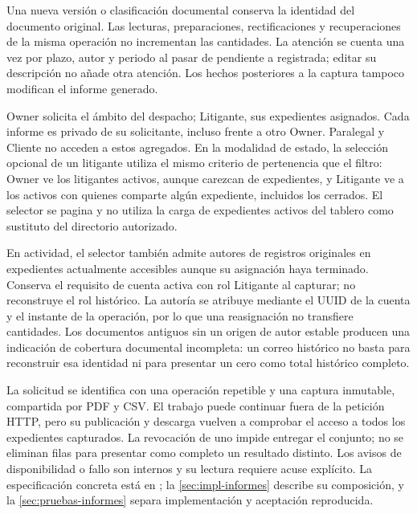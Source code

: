 Una nueva versión o clasificación documental conserva la identidad del documento
original. Las lecturas, preparaciones, rectificaciones y recuperaciones de la
misma operación no incrementan las cantidades. La atención se cuenta una vez por
plazo, autor y periodo al pasar de pendiente a registrada; editar su descripción
no añade otra atención. Los hechos posteriores a la captura tampoco modifican
el informe generado.

Owner solicita el ámbito del despacho; Litigante, sus expedientes asignados.
Cada informe es privado de su solicitante, incluso frente a otro Owner.
Paralegal y Cliente no acceden a estos agregados. En la modalidad de estado,
la selección opcional de un litigante utiliza el mismo criterio de pertenencia
que el filtro: Owner ve los litigantes activos, aunque carezcan de expedientes,
y Litigante ve a los
activos con quienes comparte algún expediente, incluidos los cerrados. El
selector se pagina y no utiliza la carga de expedientes activos del tablero
como sustituto del directorio autorizado.

En actividad, el selector también admite autores de registros originales en
expedientes actualmente accesibles aunque su asignación haya terminado. Conserva
el requisito de cuenta activa con rol Litigante al capturar; no reconstruye el
rol histórico. La autoría se atribuye mediante el UUID de la cuenta y el instante
de la operación, por lo que una reasignación no transfiere cantidades. Los
documentos antiguos sin un origen de autor estable producen una indicación de
cobertura documental incompleta: un correo histórico no basta para reconstruir
esa identidad ni para presentar un cero como total histórico completo.

La solicitud se identifica con una operación repetible y una captura inmutable,
compartida por PDF y CSV. El trabajo puede continuar fuera de la petición HTTP,
pero su publicación y descarga vuelven a comprobar el acceso a todos los
expedientes capturados. La revocación de uno impide entregar el conjunto; no se
eliminan filas para presentar como completo un resultado distinto. Los avisos
de disponibilidad o fallo son internos y su lectura requiere acuse explícito.
La especificación concreta está en ; la
\cref{sec:impl-informes} describe su composición, y la
\cref{sec:pruebas-informes} separa implementación y aceptación reproducida.
